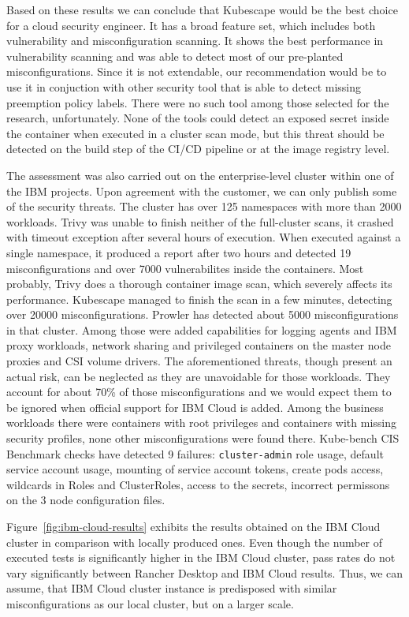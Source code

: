 Based on these results we can conclude that Kubescape would be the best choice for a cloud security engineer. It has a broad feature set, which includes both vulnerability and misconfiguration scanning. It shows the best performance in vulnerability scanning and was able to detect most of our pre-planted misconfigurations. Since it is not extendable, our recommendation would be to use it in conjuction with other security tool that is able to detect missing preemption policy labels. There were no such tool among those selected for the research, unfortunately. None of the tools could detect an exposed secret inside the container when executed in a cluster scan mode, but this threat should be detected on the build step of the CI/CD pipeline or at the image registry level.

The assessment was also carried out on the enterprise-level cluster within one of the IBM projects. Upon agreement with the customer, we can only publish some of the security threats. The cluster has over 125 namespaces with more than 2000 workloads. Trivy was unable to finish neither of the full-cluster scans, it crashed with timeout exception after several hours of execution. When executed against a single namespace, it produced a report after two hours and detected 19 misconfigurations and over 7000 vulnerabilites inside the containers. Most probably, Trivy does a thorough container image scan, which severely affects its performance. Kubescape managed to finish the scan in a few minutes, detecting over 20000 misconfigurations. Prowler has detected about 5000 misconfigurations in that cluster. Among those were added capabilities for logging agents and IBM proxy workloads, network sharing and privileged containers on the master node proxies and CSI volume drivers. The aforementioned threats, though present an actual risk, can be neglected as they are unavoidable for those workloads. They account for about 70\% of those misconfigurations and we would expect them to be ignored when official support for IBM Cloud is added. Among the business workloads there were containers with root privileges and containers with missing security profiles, none other misconfigurations were found there. Kube-bench CIS Benchmark checks have detected 9 failures: \lstinline{cluster-admin} role usage, default service account usage, mounting of service account tokens, create pods access, wildcards in Roles and ClusterRoles, access to the secrets, incorrect permissons on the 3 node configuration files. 

Figure~\ref{fig:ibm-cloud-results} exhibits the results obtained on the IBM Cloud cluster in comparison
with locally produced ones. Even though the number of executed tests is significantly higher in the IBM Cloud cluster, pass rates do not vary significantly between Rancher Desktop and IBM Cloud results. Thus, we can assume, that IBM Cloud cluster instance is predisposed with similar misconfigurations as our local cluster, but on a larger scale.

